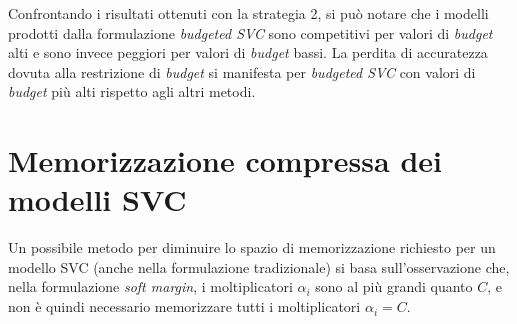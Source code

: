 Confrontando i risultati ottenuti con la strategia 2, si può notare che i modelli prodotti dalla formulazione \emph{budgeted SVC} sono competitivi per valori di \emph{budget} alti e sono invece peggiori per valori di \emph{budget} bassi. 
La perdita di accuratezza dovuta alla restrizione di \emph{budget} si manifesta per \emph{budgeted SVC} con valori di \emph{budget} più alti rispetto agli altri metodi.

\section{Memorizzazione compressa dei modelli SVC}\label{sec:memorizzazione_compressa}
Un possibile metodo per diminuire lo spazio di memorizzazione richiesto per un modello SVC (anche nella formulazione tradizionale) si basa sull'osservazione che, nella formulazione \emph{soft margin}, i moltiplicatori $\alpha_i$ sono al più grandi quanto $C$, e non è quindi necessario memorizzare tutti i moltiplicatori $\alpha_i = C$.

